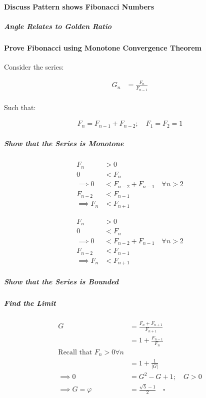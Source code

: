 \documentclass[11pt]{article}
\begin{document}
\paragraph{Discuss Pattern shows Fibonacci Numbers}
\label{sec:org3b06b33}
\subparagraph{Angle Relates to Golden Ratio}
\label{sec:orgdd151cc}
\paragraph{Prove Fibonacci using Monotone Convergence Theorem}
\label{sec:org65bf37b}
Consider the series:

$$\begin{aligned}
G_n &= \frac{F_{n} }{F_{n - 1} } \\
\end{aligned}$$

Such that:

$$\begin{aligned}
F_n = F_{n- 1} +  F_{n- 2} ; \quad F_1 = F_2 = 1
\end{aligned}$$


\subparagraph{Show that the Series is Monotone}
\label{sec:orgabed5d8}
$$\begin{aligned}
F_{n} &> 0 \\
0 &< F_{n} \\
 \implies   0 &< F_{n - 2} +  F_{n- 1} \quad \forall n > 2 \\
  F_{n- 2} &< F_{n- 1}  \\
   \implies  F_n & < F_{n+1}
\end{aligned}$$

$$\begin{aligned}
F_{n} &> 0 \\
0 &< F_{n} \\
 \implies   0 &< F_{n - 2} +  F_{n- 1} \quad \forall n > 2 \\
  F_{n- 2} &< F_{n- 1}  \\
   \implies  F_n & < F_{n+1}
\end{aligned}$$



\subparagraph{Show that the Series is Bounded}
\label{sec:orge35294a}
\subparagraph{Find the Limit}
\label{sec:org45dc846}
$$\begin{aligned}
G &= \frac{F_{n} +  F_{n+  1} }{F_{n+  1} } \\
&= 1 +  \frac{F_{n- 1} }{F_n} \\
\text{Recall that $F_n > 0 \forall n$}\\
&=  1 +  \frac{1}{    \left\lvert G \right\rvert } \\
 \implies  0 &= G^2- G +  1; \quad G > 0  \\
  \implies  G = \varphi &=  \frac{\sqrt{5} - 1  }{2} \quad  \square
\end{aligned}$$
\end{document}
